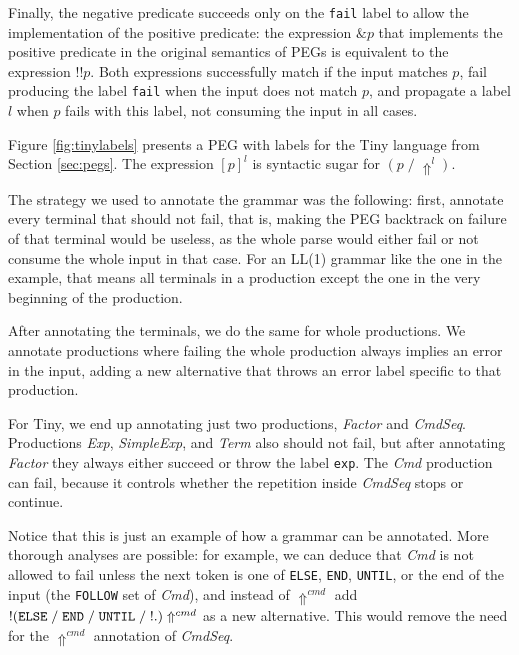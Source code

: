 \documentclass[3p,12pt,singlecolumn]{elsarticle}
\newcommand{\throw}{\Uparrow}
\begin{document}
Finally, the negative predicate succeeds only on the
 \texttt{fail} label to
allow the implementation of the positive predicate: the
 expression
$\&p$ that implements the positive predicate in the original semantics
of PEGs \cite{ford2002packrat,ford2002pappy,ford2004peg}
is equivalent to the expression $!!p$.
Both expressions successfully match if the input matches $p$,
fail producing the label \texttt{fail} when the input does
not match $p$, and propagate a label $l$ when $p$ fails
with this label, not consuming the input in all cases.

Figure \ref{fig:tinylabels} presents a PEG with labels for the Tiny
language from Section \ref{sec:pegs}. 
The expression $[p]^{l}$ is syntactic
sugar for $(p \; / \; \throw^{l})$. 

The strategy we used to annotate the grammar was the following:
first, annotate every terminal that should not fail, that is,
making the PEG backtrack on failure of that terminal would
be useless, as the whole parse would either fail or not consume
the whole input in that case. For an LL(1) grammar like the
one in the example, that means all terminals in a production except
the one in the very beginning of the production.

After annotating the terminals, we do the same for whole productions.
We annotate productions where failing the whole production 
always implies an error in the input, adding a new alternative that
throws an error label specific to that production.

For Tiny,
we end up annotating just two productions, {\em Factor} and {\em CmdSeq}.
Productions {\em Exp}, {\em SimpleExp}, and {\em Term} also
should not fail, but after annotating {\em Factor} they always
either succeed or throw the label {\tt exp}. The {\it Cmd}
production can fail, because it controls whether the repetition inside
{\it CmdSeq} stops or continue.

Notice that this is just an example of how a grammar can be
annotated. More thorough analyses are possible: for example,
we can deduce that {\it Cmd} is not allowed to fail unless
the next token is one of {\tt ELSE}, {\tt END}, {\tt UNTIL},
or the end of the input (the {\tt FOLLOW} set of {\it Cmd}), and instead of $\throw^{cmd}$ add $!({\tt ELSE} \; / \; {\tt END} \; / \;
{\tt UNTIL} \; / \; !.) \throw^{cmd}$ as a new alternative. This would
remove the need for the $\throw^{cmd}$ annotation of {\it CmdSeq}.
\end{document}

